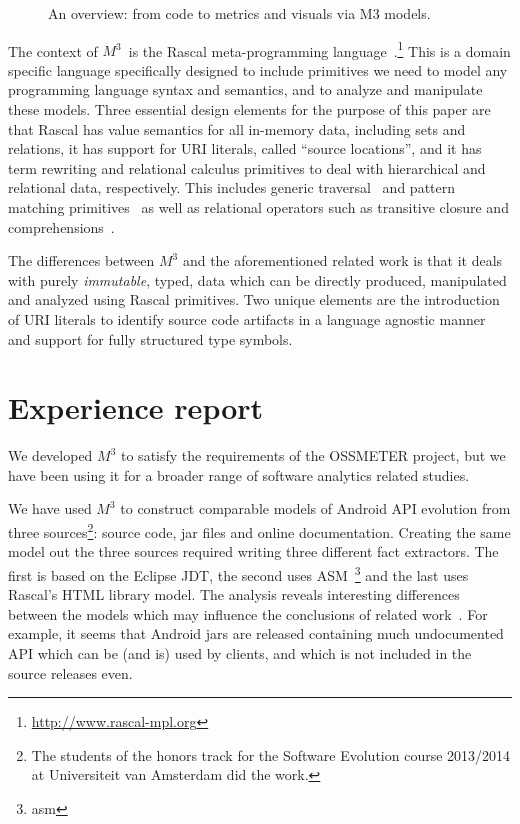 \documentclass[conference]{IEEEtran}
\newcommand{\mthree}{\ensuremath{M^3}\xspace}
\begin{document}
\begin{figure}[t]
	\resizebox{\columnwidth}{!}{}
\caption{An overview: from code to metrics and visuals via M3 models.}
\end{figure}

The context of \mthree\ is the Rascal meta-programming 
language~\cite{KvdSV- Rascal11,rascalscam}.\footnote{\url{http://www.rascal-mpl.org}} 
This is a
domain specific language specifically designed to include primitives we need
to model any programming language syntax and semantics, and to analyze and
manipulate these models. Three essential design elements for the purpose of
this paper are that Rascal has value semantics for all in-memory data,
including sets and relations, it has support for URI literals, called ``source
locations'', and it has term rewriting and relational calculus primitives to
deal with hierarchical and relational data, respectively. This includes
generic traversal~\cite{scrap,travfuncs} and pattern matching primitives~\cite{?} as well as relational
operators such as transitive closure and comprehensions~\cite{tarski}.

The differences between \mthree and the aforementioned related work is that it deals with purely \emph{immutable},
typed, data which can be directly produced, manipulated and analyzed using
Rascal primitives. Two unique elements are the introduction of URI literals to
identify source code artifacts in a language agnostic manner and support for
fully structured type symbols.

\section{Experience report}

We developed \mthree to satisfy the requirements of the OSSMETER project, but we have been using it for a broader range of software analytics related studies.

We have used \mthree to construct comparable models of Android API evolution from three sources\footnote{The students of the honors track for the Software Evolution course 2013/2014 at Universiteit van Amsterdam did the work.}: source code, jar files and online documentation. Creating the same model out the three sources required writing three different fact extractors. The first is based on the Eclipse JDT, the second uses ASM~\footnote{asm} and the last uses Rascal's HTML library model. The analysis reveals interesting differences between the models which may influence the conclusions of related work~\cite{apianalysis}. For example, it seems that Android jars are released containing much undocumented API which can be (and is) used by clients, and which is not included in the source releases even.
\end{document}
